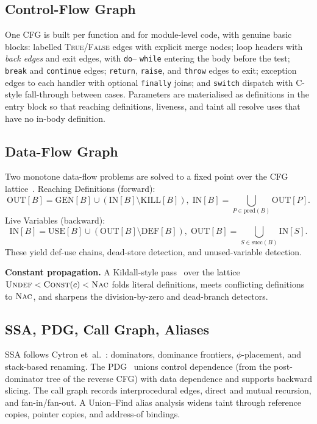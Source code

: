 \documentclass[10pt,conference]{IEEEtran}
\begin{document}
\subsection{Control-Flow Graph}
One CFG is built per function and for module-level code, with genuine basic
blocks: labelled \textsc{True}/\textsc{False} edges with explicit merge nodes;
loop headers with \emph{back edges} and exit edges, with \texttt{do}--%
\texttt{while} entering the body before the test; \texttt{break} and
\texttt{continue} edges; \texttt{return}, \texttt{raise}, and \texttt{throw}
edges to exit; exception edges to each handler with optional \texttt{finally}
joins; and \texttt{switch} dispatch with C-style fall-through between cases.
Parameters are materialised as definitions in the entry block so that
reaching definitions, liveness, and taint all resolve uses that have no
in-body definition.

\subsection{Data-Flow Graph}
Two monotone data-flow problems are solved to a fixed point over the CFG
lattice~\cite{dragon}. Reaching Definitions (forward):
\begin{equation}
\mathrm{OUT}[B]=\mathrm{GEN}[B]\cup(\mathrm{IN}[B]\setminus\mathrm{KILL}[B]),\;
\mathrm{IN}[B]=\!\!\bigcup_{P\in\mathrm{pred}(B)}\!\!\mathrm{OUT}[P].
\end{equation}
Live Variables (backward):
\begin{equation}
\mathrm{IN}[B]=\mathrm{USE}[B]\cup(\mathrm{OUT}[B]\setminus\mathrm{DEF}[B]),\;
\mathrm{OUT}[B]=\!\!\bigcup_{S\in\mathrm{succ}(B)}\!\!\mathrm{IN}[S].
\end{equation}
These yield def-use chains, dead-store detection, and unused-variable
detection.

\textbf{Constant propagation.} A Kildall-style pass~\cite{kildall} over the
lattice $\textsc{Undef}<\textsc{Const}(c)<\textsc{Nac}$ folds literal
definitions, meets conflicting definitions to $\textsc{Nac}$, and sharpens the
division-by-zero and dead-branch detectors.

\subsection{SSA, PDG, Call Graph, Aliases}
SSA follows Cytron et~al.~\cite{cytron}: dominators, dominance frontiers,
$\phi$-placement, and stack-based renaming. The PDG~\cite{fow} unions control
dependence (from the post-dominator tree of the reverse CFG) with data
dependence and supports backward slicing. The call graph records
interprocedural edges, direct and mutual recursion, and fan-in/fan-out. A
Union--Find alias analysis widens taint through reference copies, pointer
copies, and address-of bindings.
\end{document}
